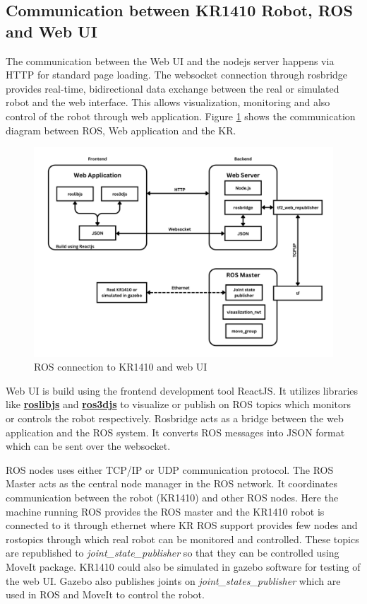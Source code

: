 \subsection{Communication between KR1410 Robot, ROS and Web UI}
\label{subsec:KR1410ROS}

The communication between the Web UI and the nodejs server happens via HTTP for standard page loading. The websocket connection through rosbridge provides real-time, bidirectional data exchange between the real or simulated robot and the web interface. This allows visualization, monitoring
and also control of the robot through web application. Figure \ref{fig:ros-web-graph} shows the communication diagram between ROS, Web application and the KR.

\begin{figure}[h]
  \centering
  \includegraphics[width=1\textwidth]{figures/ros-web-graph.png}
  \caption{ROS connection to KR1410 and web UI}
  \label{fig:ros-web-graph}
\end{figure}

Web UI is build using the frontend development tool ReactJS. It utilizes libraries like \hyperref[par:roslibjs]{\textbf{roslibjs}} and \hyperref[par:ros3djs]{\textbf{ros3djs}} to visualize or publish on ROS topics which monitors or controls the robot respectively. Rosbridge acts as a bridge between the web application and the ROS system. It converts ROS messages into JSON format which can be sent over the websocket.

ROS nodes uses either TCP/IP or UDP communication protocol. 
The ROS Master acts as the central node manager in the ROS network. It coordinates communication between the robot (KR1410) and other ROS nodes.
Here the machine running ROS provides the ROS master \cite{rosmaster} and the KR1410 robot is connected to it through ethernet where KR ROS support provides few nodes and rostopics through which real robot can be monitored and controlled. These topics are republished to \textit{joint\_state\_publisher} so that they can be controlled using MoveIt package.
KR1410 could also be simulated in gazebo software for testing of the web UI. Gazebo also publishes joints on \textit{joint\_states\_publisher} which are used in ROS and MoveIt to control the robot.

